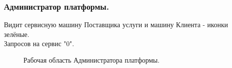 \documentclass[russian,utf8,12pt,emptystyle]{eskdtext}
\begin{document}
 \subsubsection{Администратор платформы.} 
 Видит сервисную машину Поставщика услуги и машину Клиента - иконки зелёные.\\
 Запросов на сервис "0". 
\begin{figure}[h]
\begin{center}
\end{center}
\caption{Рабочая область Администратора платформы.}
\label{ris:image4}
\end{figure}
\end{document}
